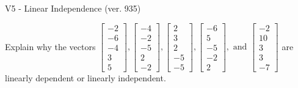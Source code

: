 \begin{exercise}
  \begin{exerciseTitle}V5 - Linear Independence (ver. 935)\end{exerciseTitle}
  \begin{exerciseStatement}
    Explain why the vectors \(\left[\begin{array}{r}
-2 \\
-6 \\
-4 \\
3 \\
5
\end{array}\right] , \left[\begin{array}{r}
-4 \\
-2 \\
-5 \\
2 \\
-2
\end{array}\right] , \left[\begin{array}{r}
2 \\
3 \\
2 \\
-5 \\
-5
\end{array}\right] , \left[\begin{array}{r}
-6 \\
5 \\
-5 \\
-2 \\
2
\end{array}\right] , \text{ and } \left[\begin{array}{r}
-2 \\
10 \\
3 \\
3 \\
-7
\end{array}\right]\) are linearly dependent or linearly independent.	



\end{exerciseStatement}
\end{exercise}
